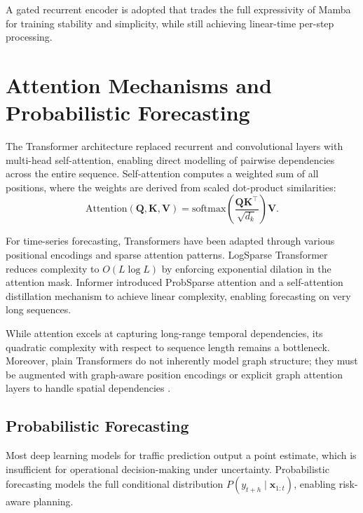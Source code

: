 A gated recurrent encoder is adopted that trades the full expressivity of Mamba for training stability and simplicity, while still achieving linear-time per-step processing.

\section{Attention Mechanisms and Probabilistic Forecasting}
\label{sec:attention}

The Transformer architecture \cite{vaswani2017attention} replaced recurrent and convolutional layers with multi-head self-attention, enabling direct modelling of pairwise dependencies across the entire sequence. Self-attention computes a weighted sum of all positions, where the weights are derived from scaled dot-product similarities:
\begin{equation}
    \text{Attention}(\mathbf{Q}, \mathbf{K}, \mathbf{V}) = \text{softmax}\left(\frac{\mathbf{Q}\mathbf{K}^\top}{\sqrt{d_k}}\right)\mathbf{V}.
    \label{eq:self_attention}
\end{equation}

For time-series forecasting, Transformers have been adapted through various positional encodings and sparse attention patterns. LogSparse Transformer \cite{li2019enhancing} reduces complexity to $O(L \log L)$ by enforcing exponential dilation in the attention mask. Informer \cite{zhou2021informer} introduced ProbSparse attention and a self-attention distillation mechanism to achieve linear complexity, enabling forecasting on very long sequences.

While attention excels at capturing long-range temporal dependencies, its quadratic complexity with respect to sequence length remains a bottleneck. Moreover, plain Transformers do not inherently model graph structure; they must be augmented with graph-aware position encodings or explicit graph attention layers to handle spatial dependencies \cite{zhang2021deep}.

\subsection{Probabilistic Forecasting}

Most deep learning models for traffic prediction output a point estimate, which is insufficient for operational decision-making under uncertainty. Probabilistic forecasting models the full conditional distribution $P(y_{t+h} \mid \mathbf{x}_{1:t})$, enabling risk-aware planning.

